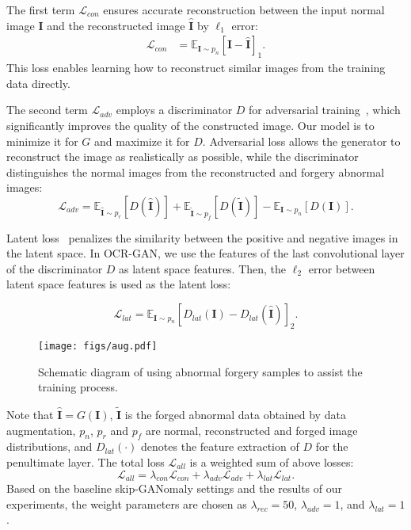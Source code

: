 \documentclass[lettersize,journal]{IEEEtran}
\begin{document}
 The first term $\mathcal{L}_{con}$ ensures accurate reconstruction between the input normal image $\bm{I}$ and the reconstructed image $\hat{\bm{I}}$ by $\ell_1$ error:
\begin{equation}
\begin{aligned}
    \mathcal{L}_{con} &= \mathbb{E}_{\bm{I}\sim p_n}[\bm{I}-\hat{\bm{I}}]_1.
\end{aligned}
\end{equation}
This loss enables learning how to reconstruct similar images from the training data directly.

 The second term $\mathcal{L}_{adv}$ employs a discriminator $D$ for adversarial training~\cite{goodfellow2014generative}, which significantly improves the quality of the constructed image. Our model is to minimize it for $G$ and maximize it for $D$. Adversarial loss allows the generator to reconstruct the image as realistically as possible, while the discriminator distinguishes the normal images from the reconstructed and forgery abnormal images:
\begin{equation}
        \mathcal{L}_{adv} = \mathbb{E}_{\hat{\bm{I}} \sim p_{r}}[D({\hat{\bm{I}}})] + \mathbb{E}_{\widetilde{\bm{I}} \sim p_{f}}[D({\widetilde{\bm{I}}})] - \mathbb{E}_{\bm{I} \sim p_{n}}[D(\bm{I})].
\end{equation}

 Latent loss~\cite{akccay2019skip} penalizes the similarity between the positive and negative images in the latent space. In OCR-GAN, we use the features of the last convolutional layer of the discriminator $D$ as latent space features. Then, the $\ell_2$ error between latent space features is used as the latent loss:

\begin{equation}
    \mathcal{L}_{lat} = \mathbb{E}_{\bm{I}\sim p_n}[D_{lat}(\bm{I}) - D_{lat}(\hat{\bm{I}})]_2.
\end{equation}

\begin{figure}[t]
    \centering
    \texttt{[image: figs/aug.pdf]}
    \caption{Schematic diagram of using abnormal forgery samples to assist the training process.}
    \label{fig:forgery}
\end{figure}
Note that $\hat{\bm{I}} = G(\bm{I})$, $\widetilde{\bm{I}}$ is the forged abnormal data obtained by data augmentation, $p_{n}$, $p_{r}$ and $p_{f}$ are normal, reconstructed and forged image distributions, and $D_{lat}(\cdot)$ denotes the feature extraction of $D$ for the penultimate layer. The total loss $\mathcal{L}_{all}$ is a weighted sum of above losses:
\begin{equation}
    \mathcal{L}_{all} = \lambda_{con}\mathcal{L}_{con} + \lambda_{adv}\mathcal{L}_{adv} + \lambda_{lat}\mathcal{L}_{lat}.
\end{equation}
Based on the baseline skip-GANomaly settings and the results of our experiments, the weight parameters are chosen as $\lambda_{rec} = 50$, $\lambda_{adv} = 1$, and $\lambda_{lat} = 1$.
\end{document}
